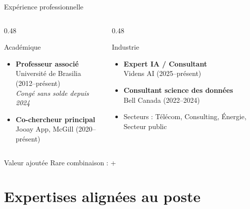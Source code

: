 \documentclass[aspectratio=169,11pt]{beamer}
\begin{document}
\begin{frame}{Expérience professionnelle}
  \begin{columns}[T]
    \begin{column}{0.48\textwidth}
      \begin{block}{Académique}
        \begin{itemize}
          \item \textbf{Professeur associé}\\Université de Brasilia (2012--présent)\\{\scriptsize\textit{Congé sans solde depuis 2024}}
          \item \textbf{Co-chercheur principal}\\Jooay App, McGill (2020--présent)
        \end{itemize}
      \end{block}
    \end{column}
    \begin{column}{0.48\textwidth}
      \begin{block}{Industrie}
        \begin{itemize}
          \item \textbf{Expert IA / Consultant}\\Videns AI (2025--présent)
          \item \textbf{Consultant science des données}\\Bell Canada (2022--2024)
          \item Secteurs : Télécom, Consulting, Énergie, Secteur public
        \end{itemize}
      \end{block}
    \end{column}
  \end{columns}
  
  \vspace{0.5em}
  \begin{alertblock}{Valeur ajoutée}
    \centering
    Rare combinaison :  + 
  \end{alertblock}
\end{frame}

\section{Expertises alignées au poste}
\end{document}
